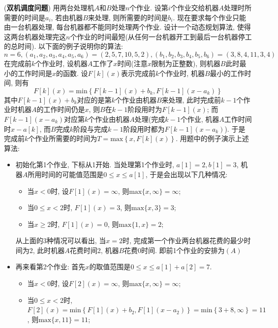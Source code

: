 \documentclass{article}
\begin{document}
\pagebreak

\begin{homeworkProblem}
	(\textbf{双机调度问题}) 用两台处理机$A$和$B $处理$n $个作业. 设第$i $个作业交给机器$A $处理时所需要的时间是$a_i$, 若由机器$B $来处理, 则所需要的时间是$b_i$. 现在要求每个作业只能由一台机器处理, 每台机器都不能同时处理两个作业. 设计一个动态规划算法, 使得这两台机器处理完这$n$个作业的时间最短(从任何一台机器开工到最后一台机器停工的总时间). 以下面的例子说明你的算法:
	$$
	n=6,\left( a_1,a_2,a_3,a_4,a_5,a_6 \right) =\left( 2,5,7,10,5,2 \right) , \left( b_1,b_2,b_3,b_4,b_5,b_6 \right) =\left( 3,8,4,11,3,4 \right) 
	$$
	在完成前$k$个作业时, 设机器$A$工作了$x$时间(注意$x$限制为正整数), 则机器$B$此时最小的工作时间是$x$的函数. 设$F[k](x)$表示完成前$k$个作业时, 机器$B$最小的工作时间, 则有
	$$
	F\left[ k \right] \left( x \right) =\text{min} \left\{ F\left[ k-1 \right] \left( x \right) +b_k,F\left[ k-1 \right] \left( x-a_k \right) \right\} 
	$$
	其中$F[k-1](x)+b_k$对应的是第$k$个作业由机器$B$来处理, 此时完成前$k-1$个作业时机器$A$的工作时间仍是$x$, 则$B$在$k-1$阶段用时为$F[k-1](x)$; 而$F[k-1](x-a_k)$对应第$k$个作业由机器$A$处理(完成$k-1$个作业, 机器$A$工作时间时$x-a[k]$, 而$B$完成$k$阶段与完成$k-1$阶段用时都为$F[k-1](x-a_k)$). 于是完成前$k$个作业所需要的时间为$T=\text{max} \left\{ x,F\left[ k \right] \left( x \right) \right\} $. 用题中的例子演示上述算法:
	\begin{itemize}
		\item 初始化第1个作业, 下标从1开始. 当处理第1个作业时, $a[1]=2,b[1]=3$, 机器$A$所用时间的可能值范围是$0\leq x \leq a[1]$, 于是会出现以下几种情况:
		\begin{itemize}
			\item 当$x<0$时, 设$F[1](x)=\infty$, 则$\text{max}\{x,\infty\}=\infty$;
			\item 当$0\leq x<2$时, $F[1](x)=3$, 则$\text{max}\{x,3\}=3$;
			\item 当$x\geq 2$时, $F[1](x)=0$, 则$\text{max}\{1,x\}=2$;
		\end{itemize}
		从上面的3种情况可以看出, 当$x=2$时, 完成第一个作业两台机器花费的最少时间为2, 此时机器$A$花费时间2, 机器$B$花费0时间. 即前1个作业的安排为$(A)$
		\item 再来看第2个作业: 首先$x$的取值范围是$0\leq x\leq a[1]+a[2]=7$.
		\begin{itemize}
			\item 当$x<0$时, 设$F[2](x)=\infty$, 则$\text{max}\{x,\infty\}=\infty$;
			\item 当$0\leq x<2$时, $F\left[ 2 \right] \left( x \right) =\text{min} \left\{ F\left[ 1 \right] \left( x \right) +b_2,F\left[ 1 \right] \left( x-a_2 \right) \right\} =\text{min} \left\{ 3+8,\infty \right\} =11$, 则$\text{max}\{x,11\}=11$;

\end{itemize}
\end{itemize}
\end{homeworkProblem}
\end{document}
